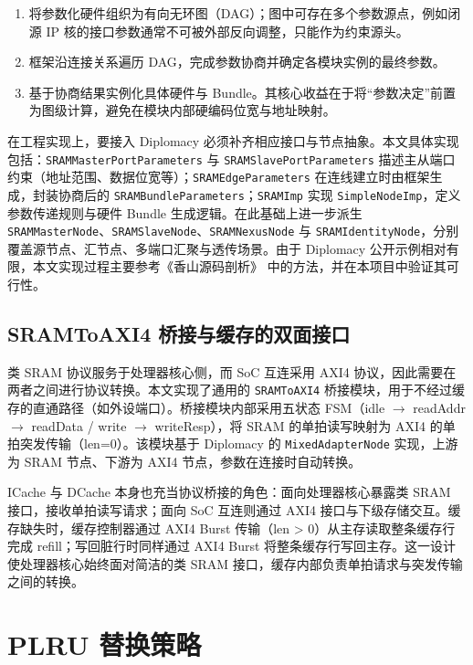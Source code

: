 \begin{enumerate}
  \item 将参数化硬件组织为有向无环图（DAG）；图中可存在多个参数源点，例如闭源 IP 核的接口参数通常不可被外部反向调整，只能作为约束源头。
  \item 框架沿连接关系遍历 DAG，完成参数协商并确定各模块实例的最终参数。
  \item 基于协商结果实例化具体硬件与 Bundle。其核心收益在于将“参数决定”前置为图级计算，避免在模块内部硬编码位宽与地址映射。
\end{enumerate}

在工程实现上，要接入 Diplomacy 必须补齐相应接口与节点抽象。本文具体实现包括：\lstinline|SRAMMasterPortParameters| 与 \lstinline|SRAMSlavePortParameters| 描述主从端口约束（地址范围、数据位宽等）；\lstinline|SRAMEdgeParameters| 在连线建立时由框架生成，封装协商后的 \lstinline|SRAMBundleParameters|；\lstinline|SRAMImp| 实现 \lstinline|SimpleNodeImp|，定义参数传递规则与硬件 Bundle 生成逻辑。在此基础上进一步派生 \lstinline|SRAMMasterNode|、\lstinline|SRAMSlaveNode|、\lstinline|SRAMNexusNode| 与 \lstinline|SRAMIdentityNode|，分别覆盖源节点、汇节点、多端口汇聚与透传场景。由于 Diplomacy 公开示例相对有限，本文实现过程主要参考《香山源码剖析》\cite{MaoDeCaoRISCVCPUXinPianSheJi} 中的方法，并在本项目中验证其可行性。

\subsection{SRAMToAXI4 桥接与缓存的双面接口}

类 SRAM 协议服务于处理器核心侧，而 SoC 互连采用 AXI4 协议，因此需要在两者之间进行协议转换。本文实现了通用的 \lstinline|SRAMToAXI4| 桥接模块，用于不经过缓存的直通路径（如外设端口）。桥接模块内部采用五状态 FSM（idle $\to$ readAddr $\to$ readData / write $\to$ writeResp），将 SRAM 的单拍读写映射为 AXI4 的单拍突发传输（len=0）。该模块基于 Diplomacy 的 \lstinline|MixedAdapterNode| 实现，上游为 SRAM 节点、下游为 AXI4 节点，参数在连接时自动转换。

ICache 与 DCache 本身也充当协议桥接的角色：面向处理器核心暴露类 SRAM 接口，接收单拍读写请求；面向 SoC 互连则通过 AXI4 接口与下级存储交互。缓存缺失时，缓存控制器通过 AXI4 Burst 传输（len > 0）从主存读取整条缓存行完成 refill；写回脏行时同样通过 AXI4 Burst 将整条缓存行写回主存。这一设计使处理器核心始终面对简洁的类 SRAM 接口，缓存内部负责单拍请求与突发传输之间的转换。

\section{PLRU 替换策略}

